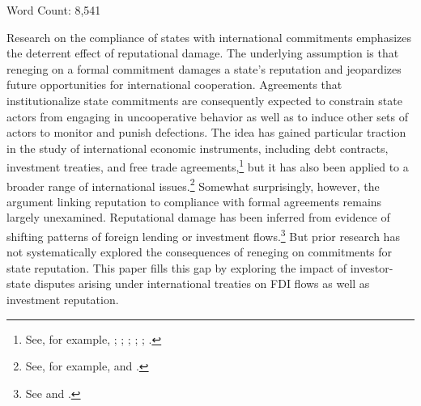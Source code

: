 \documentclass[12pt,onesided]{amsart}
\begin{document}
\vspace{10mm}

\begin{center}
Word Count: 8,541
\end{center}

\newpage

\setcounter{page}{1}
\doublespacing


Research on the compliance of states with international commitments emphasizes the deterrent effect of reputational damage. The underlying assumption is that reneging on a formal commitment damages a state's reputation and jeopardizes future opportunities for international cooperation. Agreements that institutionalize state commitments are consequently expected to constrain state actors from engaging in uncooperative behavior as well as to induce other sets of actors to monitor and punish defections. The idea has gained particular traction in the study of international economic instruments, including debt contracts, investment treaties, and free trade agreements,\footnote{See, for example, \citet{allee:peinhardt:2011}; \citet{buthe:milner:2014}; \citet{buthe:milner:2008}; \citet{elkins:etal:2006}; \citet{simmons:2000}; \citet{tomz:2007}.} but it has also been applied to a broader range of international issues.\footnote{See, for example, \citet{fearon:1997} and \citet{simmons:danner:2010}.} Somewhat surprisingly, however, the argument linking reputation to compliance with formal agreements remains largely unexamined. Reputational damage has been inferred from evidence of shifting patterns of foreign lending or investment flows.\footnote{See \citet{tomz:2007} and \citet{allee:peinhardt:2011}.} But prior research has not systematically explored the consequences of reneging on commitments for state reputation. This paper fills this gap by exploring the  impact of investor-state disputes arising under international treaties on FDI flows as well as investment reputation. 
\end{document}
